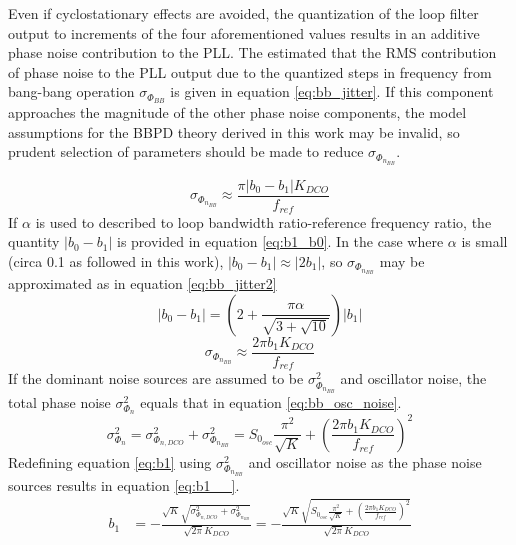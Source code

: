 	Even if cyclostationary effects are avoided, the quantization of the loop filter output to increments of the four aforementioned values results in an additive phase noise contribution to the PLL. The estimated that the RMS contribution of phase noise to the PLL output due to the quantized steps in frequency from bang-bang operation $\sigma_{\Phi_{BB}}$ is given in equation \ref{eq:bb_jitter}. If this component approaches the magnitude of the other phase noise components, the model assumptions for the BBPD theory derived in this work may be invalid, so prudent selection of parameters should be made to reduce $\sigma_{\Phi_{n_{BB}}}$.

		\begin{equation}\label{eq:bb_jitter}
			\sigma_{\Phi_{n_{BB}}} \approx \frac{\pi|b_0-b_1|K_{DCO}}{f_{ref}}
		\end{equation}
	If $\alpha$ is used to described to loop bandwidth ratio-reference frequency ratio, the quantity $|b_0-b_1|$ is provided in equation \ref{eq:b1_b0}. In the case where $\alpha$ is small (circa 0.1 as followed in this work), $|b_0-b_1| \approx |2b_1|$, so $\sigma_{\Phi_{n_{BB}}}$ may be approximated as in equation \ref{eq:bb_jitter2}
	\begin{equation}\label{eq:b1_b0}
			|b_0-b_1| = \left(2 + \frac{\pi \alpha}{\sqrt{3+\sqrt{10}}}\right)|b_1|
	\end{equation}
	\begin{equation}\label{eq:bb_jitter2}
		\sigma_{\Phi_{n_{BB}}} \approx \frac{2\pi b_1K_{DCO}}{f_{ref}}
	\end{equation}	
	If the dominant noise sources are assumed to be $\sigma^2_{\Phi_{n_{BB}}}$ and oscillator noise, the total phase noise $\sigma^2_{\Phi_{n}}$ equals that in equation \ref{eq:bb_osc_noise}.
	\begin{equation}\label{eq:bb_osc_noise}
		\sigma_{\Phi_{n}}^2 = \sigma_{\Phi_{n,DCO}}^2 + \sigma^2_{\Phi_{n_{BB}}} = S_{0_{osc}}\frac{\pi^2}{\sqrt{K}} + \left( \frac{2\pi b_1K_{DCO}}{f_{ref}} \right)^2
	\end{equation}
	Redefining equation \ref{eq:b1} using $\sigma^2_{\Phi_{n_{BB}}}$ and oscillator noise as the phase noise sources results in equation \ref{eq:b1__}.
		\begin{align}
			 b_1 &=  - \frac{\sqrt{K}\sqrt{\sigma_{\Phi_{n,DCO}}^2 + \sigma^2_{\Phi_{n_{BB}}} }}{\sqrt{2\pi}K_{DCO}} = - \frac{\sqrt{K}\sqrt{  S_{0_{osc}}\frac{\pi^2}{\sqrt{K}} + \left( \frac{2\pi b_1K_{DCO}}{f_{ref}} \right)^2 }}{\sqrt{2\pi}K_{DCO}}\label{eq:b1__} 
		\end{align}
